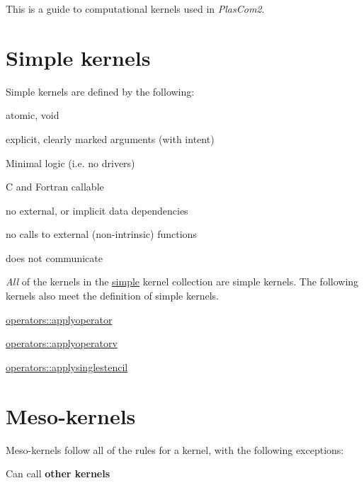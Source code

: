 This is a guide to computational kernels used in {\itshape Plas\+Com2}.



\hypertarget{kernel_documentation_SimpleKernels}{}\section{Simple kernels}\label{kernel_documentation_SimpleKernels}
Simple kernels are defined by the following\+:


\begin{DoxyItemize}
\item atomic, void
\item explicit, clearly marked arguments (with intent)
\item Minimal logic (i.\+e. no drivers)
\item C and Fortran callable
\item no external, or implicit data dependencies
\item no calls to external (non-\/intrinsic) functions
\item does not communicate
\end{DoxyItemize}

{\itshape All} of the kernels in the \hyperlink{namespacesimple}{simple} kernel collection are simple kernels. The following kernels also meet the definition of simple kernels.


\begin{DoxyItemize}
\item \hyperlink{namespaceoperators_aee961d7de8b2c319cd0270f5ae735de7}{operators\+::applyoperator}
\item \hyperlink{namespaceoperators_ad6db84fac96d0301e9802d7504d4b927}{operators\+::applyoperatorv}
\item \hyperlink{namespaceoperators_ac15b9cb3b0cb47f9a68c536b4f096941}{operators\+::applysinglestencil}
\end{DoxyItemize}\hypertarget{kernel_documentation_MesoKernels}{}\section{Meso-\/kernels}\label{kernel_documentation_MesoKernels}
Meso-\/kernels follow all of the rules for a kernel, with the following exceptions\+:


\begin{DoxyItemize}
\item Can call {\bfseries other kernels}
\end{DoxyItemize}

